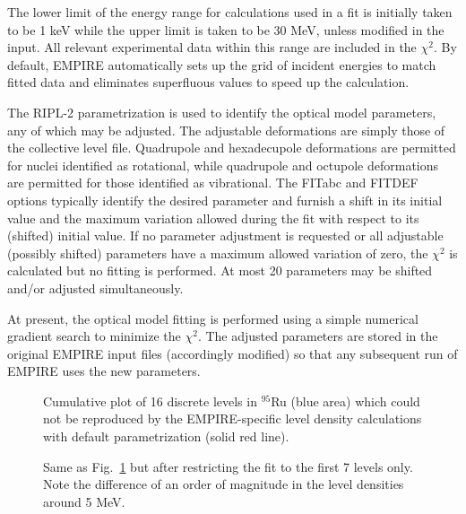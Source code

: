 \documentclass[twocolumn,amsmath,amssymb,10pt,groupedaddress,letter]{revtex4}
\begin{document}
The lower limit of the energy range for calculations used in a fit is initially taken to be 1 keV while the upper limit is taken to be 30 MeV, unless modified in the input. All relevant experimental data within this range are included in the $\chi^{2}$.  By default, EMPIRE automatically sets up the grid of incident energies to match fitted data and eliminates superfluous values to speed up the calculation.

The RIPL-2 parametrization is used to identify the optical model parameters, any of which may be adjusted. The adjustable deformations are simply those of the collective level file. Quadrupole and hexadecupole deformations are permitted for nuclei identified as rotational, while quadrupole and octupole deformations are permitted for those identified as vibrational. The FITabc and FITDEF options typically identify the desired parameter and furnish a shift in its initial value and the maximum variation allowed during the fit with respect to its (shifted) initial value. If no parameter adjustment is requested or all adjustable (possibly shifted) parameters have a maximum allowed variation of zero, the $\chi^{2}$ is calculated but no fitting is performed. At most 20 parameters may be shifted and/or adjusted simultaneously.

At present, the optical model fitting is performed using a simple numerical gradient search to minimize the $\chi^{2}$. The adjusted parameters are stored in the original EMPIRE input files (accordingly modified) so that any subsequent run of EMPIRE uses the new parameters.

\begin{figure}[tbp]
\caption{\label{fig: badfit}Cumulative plot of 16 discrete levels in $^{95}$Ru (blue area) which could not be reproduced by the EMPIRE-specific level density calculations with default parametrization (solid red line).}
\end{figure}


\begin{figure}[tbp]
\caption{\label{fig: goodfit}Same as Fig.~\ref{fig: badfit} but after restricting the fit to the first 7 levels only. Note the difference of an order of magnitude in the level densities around 5 MeV.}
\end{figure}
\end{document}
